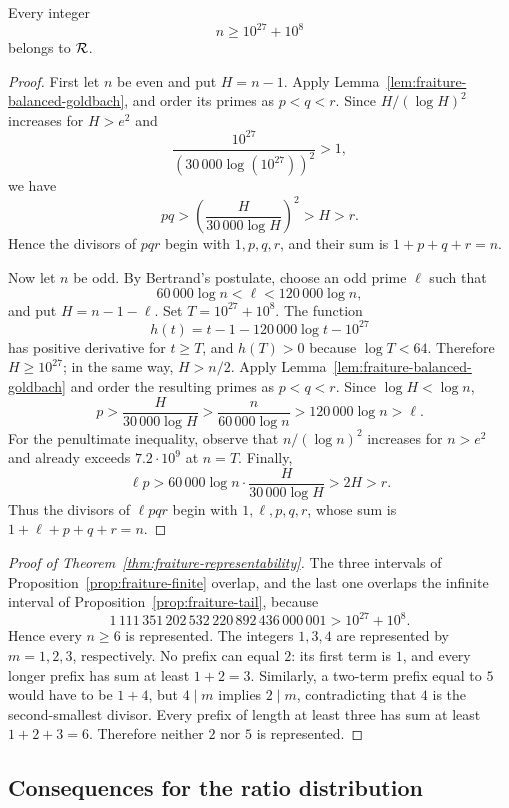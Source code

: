 \begin{proposition}
\label{prop:fraiture-tail}
Every integer
\[
 n\geq10^{27}+10^8
\]
belongs to $\mathcal R$.
\end{proposition}

\begin{proof}
First let $n$ be even and put $H=n-1$.  Apply
Lemma~\ref{lem:fraiture-balanced-goldbach}, and order its primes as
$p<q<r$.  Since $H/(\log H)^2$ increases for $H>e^2$ and
\[
 \frac{10^{27}}{(30\,000\log(10^{27}))^2}>1,
\]
we have
\[
 pq>\left(\frac{H}{30\,000\log H}\right)^2>H>r.
\]
Hence the divisors of $pqr$ begin with $1,p,q,r$, and their sum is
$1+p+q+r=n$.

Now let $n$ be odd.  By Bertrand's postulate, choose an odd prime $\ell$
such that
\[
 60\,000\log n<\ell<120\,000\log n,
\]
and put $H=n-1-\ell$.  Set $T=10^{27}+10^8$.  The function
\[
 h(t)=t-1-120\,000\log t-10^{27}
\]
has positive derivative for $t\geq T$, and $h(T)>0$ because
$\log T<64$.  Therefore $H\geq10^{27}$; in the same way,
$H>n/2$.  Apply Lemma~\ref{lem:fraiture-balanced-goldbach} and order
the resulting primes as $p<q<r$.  Since $\log H<\log n$,
\[
 p>\frac{H}{30\,000\log H}
 >\frac{n}{60\,000\log n}
 >120\,000\log n>\ell.
\]
For the penultimate inequality, observe that
$n/(\log n)^2$ increases for $n>e^2$ and already exceeds
$7.2\cdot10^9$ at $n=T$.  Finally,
\[
 \ell p>
 60\,000\log n\cdot\frac{H}{30\,000\log H}
 >2H>r.
\]
Thus the divisors of $\ell pqr$ begin with $1,\ell,p,q,r$, whose sum is
$1+\ell+p+q+r=n$.
\end{proof}

\begin{proof}[Proof of Theorem~\ref{thm:fraiture-representability}]
The three intervals of Proposition~\ref{prop:fraiture-finite} overlap,
and the last one overlaps the infinite interval of
Proposition~\ref{prop:fraiture-tail}, because
\[
 1\,111\,351\,202\,532\,220\,892\,436\,000\,001
 >10^{27}+10^8.
\]
Hence every $n\geq6$ is represented.  The integers $1,3,4$ are represented
by $m=1,2,3$, respectively.  No prefix can equal $2$: its first term is
$1$, and every longer prefix has sum at least $1+2=3$.  Similarly, a
two-term prefix equal to $5$ would have to be $1+4$, but $4\mid m$
implies $2\mid m$, contradicting that $4$ is the second-smallest divisor.
Every prefix of length at least three has sum at least $1+2+3=6$.
Therefore neither $2$ nor $5$ is represented.
\end{proof}

\subsection{Consequences for the ratio distribution}

